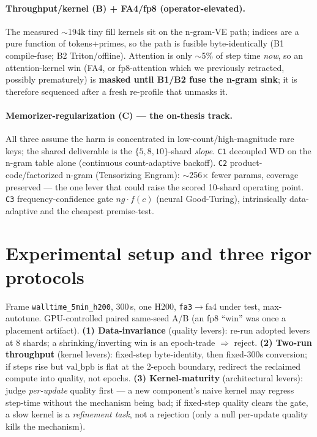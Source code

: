 \documentclass{article}
\newcommand{\valbpb}{\mathrm{val\_bpb}}
\begin{document}
\paragraph{Throughput/kernel (B) + FA4/fp8 (operator-elevated).} The measured $\sim$194k tiny fill kernels sit on the n-gram-VE path; indices are a pure function of tokens+primes, so the path is fusible byte-identically (B1 compile-fuse; B2 Triton/offline). Attention is only $\sim$5\% of step time \emph{now}, so an attention-kernel win (FA4, or fp8-attention which we previously retracted, possibly prematurely) is \textbf{masked until B1/B2 fuse the n-gram sink}; it is therefore sequenced after a fresh re-profile that unmasks it.

\paragraph{Memorizer-regularization (C) --- the on-thesis track.} All three assume the harm is concentrated in low-count/high-magnitude rare keys; the shared deliverable is the $\{5,8,10\}$-shard \emph{slope}. \texttt{C1} decoupled WD on the n-gram table alone (continuous count-adaptive backoff). \texttt{C2} product-code/factorized n-gram (Tensorizing Engram): $\sim$256$\times$ fewer params, coverage preserved --- the one lever that could raise the scored 10-shard operating point. \texttt{C3} frequency-confidence gate $ng\cdot f(c)$ (neural Good-Turing), intrinsically data-adaptive and the cheapest premise-test.

\section{Experimental setup and three rigor protocols}
Frame \texttt{walltime\_5min\_h200}, 300\,s, one H200, \texttt{fa3}$\to$fa4 under test, max-autotune. GPU-controlled paired same-seed A/B (an fp8 ``win'' was once a placement artifact). \textbf{(1) Data-invariance} (quality levers): re-run adopted levers at 8 shards; a shrinking/inverting win is an epoch-trade $\Rightarrow$ reject. \textbf{(2) Two-run throughput} (kernel levers): fixed-step byte-identity, then fixed-300s conversion; if steps rise but $\valbpb$ is flat at the 2-epoch boundary, redirect the reclaimed compute into quality, not epochs. \textbf{(3) Kernel-maturity} (architectural levers): judge \emph{per-update} quality first --- a new component's naive kernel may regress step-time without the mechanism being bad; if fixed-step quality clears the gate, a slow kernel is a \emph{refinement task}, not a rejection (only a null per-update quality kills the mechanism).
\end{document}
